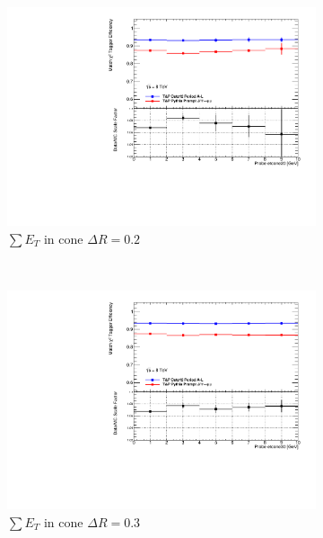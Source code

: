 \begin{figure}[phtb]
  \centering
    \begin{subfigure}[b]{0.31\textwidth}
      \includegraphics[width=\textwidth]{PartCalibration2012/Plots/SFPlots/etcone20_smt.pdf}
      \caption{$\sum E_{T}$ in cone $\Delta R=0.2$} \label{fig:Alleffsfetcone20}
    \end{subfigure}
    ~
    \begin{subfigure}[b]{0.31\textwidth}
      \includegraphics[width=\textwidth]{PartCalibration2012/Plots/SFPlots/etcone30_smt.pdf}
      \caption{$\sum E_{T}$ in cone $\Delta R=0.3$} \label{fig:Alleffsfetcone30}
    \end{subfigure}
    ~
    \begin{subfigure}[b]{0.31\textwidth}

\end{subfigure}
\end{figure}
